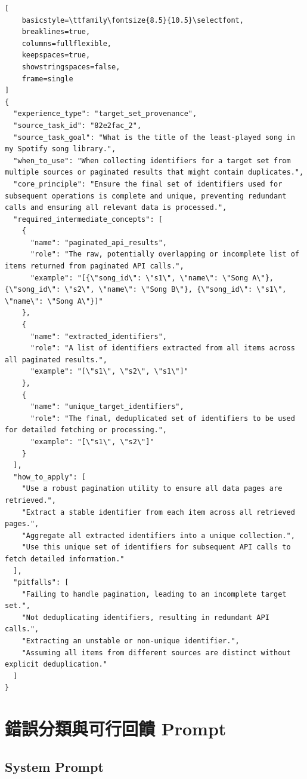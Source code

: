 \begin{lstlisting}[
    basicstyle=\ttfamily\fontsize{8.5}{10.5}\selectfont,
    breaklines=true,
    columns=fullflexible,
    keepspaces=true,
    showstringspaces=false,
    frame=single
]
{
  "experience_type": "target_set_provenance",
  "source_task_id": "82e2fac_2",
  "source_task_goal": "What is the title of the least-played song in my Spotify song library.",
  "when_to_use": "When collecting identifiers for a target set from multiple sources or paginated results that might contain duplicates.",
  "core_principle": "Ensure the final set of identifiers used for subsequent operations is complete and unique, preventing redundant calls and ensuring all relevant data is processed.",
  "required_intermediate_concepts": [
    {
      "name": "paginated_api_results",
      "role": "The raw, potentially overlapping or incomplete list of items returned from paginated API calls.",
      "example": "[{\"song_id\": \"s1\", \"name\": \"Song A\"}, {\"song_id\": \"s2\", \"name\": \"Song B\"}, {\"song_id\": \"s1\", \"name\": \"Song A\"}]"
    },
    {
      "name": "extracted_identifiers",
      "role": "A list of identifiers extracted from all items across all paginated results.",
      "example": "[\"s1\", \"s2\", \"s1\"]"
    },
    {
      "name": "unique_target_identifiers",
      "role": "The final, deduplicated set of identifiers to be used for detailed fetching or processing.",
      "example": "[\"s1\", \"s2\"]"
    }
  ],
  "how_to_apply": [
    "Use a robust pagination utility to ensure all data pages are retrieved.",
    "Extract a stable identifier from each item across all retrieved pages.",
    "Aggregate all extracted identifiers into a unique collection.",
    "Use this unique set of identifiers for subsequent API calls to fetch detailed information."
  ],
  "pitfalls": [
    "Failing to handle pagination, leading to an incomplete target set.",
    "Not deduplicating identifiers, resulting in redundant API calls.",
    "Extracting an unstable or non-unique identifier.",
    "Assuming all items from different sources are distinct without explicit deduplication."
  ]
}
\end{lstlisting}

\section{錯誤分類與可行回饋 Prompt}
\label{app:error-feedback-prompt}

\subsection*{System Prompt}

